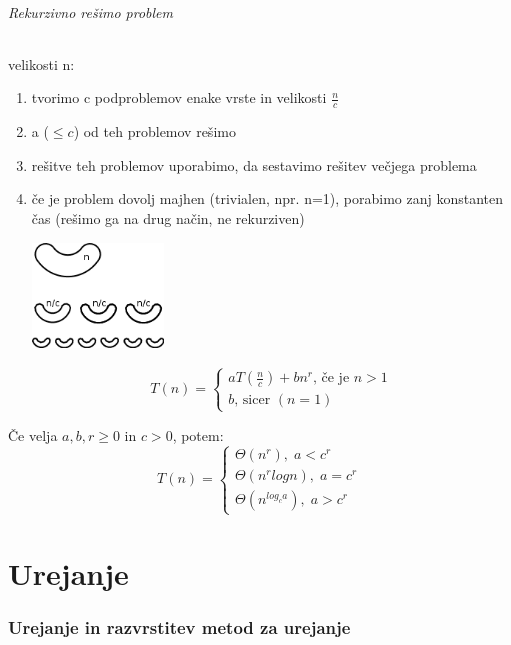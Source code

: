 \documentclass[a4paper,10pt]{article}
\begin{document}
\paragraph{Rekurzivno re\v simo problem} velikosti n:
\begin{enumerate}
\item tvorimo c podproblemov enake vrste in velikosti $\frac{n}{c}$
\item a ($\leq c$) od teh problemov re\v simo
\item re\v sitve teh problemov uporabimo, da sestavimo re\v sitev ve\v cjega problema
\item \v ce je problem dovolj majhen (trivialen, npr. n=1), porabimo zanj konstanten \v cas (re\v simo ga na drug na\v cin, ne rekurziven)
	\begin{center}
	\includegraphics[width=3.5cm,height=2.8cm]{Slike/RekurzivnaCasZahtevnost.png}
	\end{center}
$$
T(n) = 
\left\{
\begin{array}{l}
aT(\frac{n}{c}) + bn^r \mbox{, \v ce je } n>1 \\
b \mbox{, sicer } (n=1)
\end{array} 
\right.
$$
\end{enumerate}

\v Ce velja $a,b,r \geq 0$ in $c > 0$, potem:
\begin{equation}
T(n)=
\left\{
\begin{array}{l}
\Theta (n^r),\; a<c^r \\
\Theta (n^r log n),\; a=c^r \\
\Theta (n^{log_ca}),\; a>c^r
\end{array}
\right.
\label{casovna zahtevnost za rekurzivne algoritme}
\end{equation}

\part{Urejanje}

\section{Urejanje in razvrstitev metod za urejanje}
\end{document}
